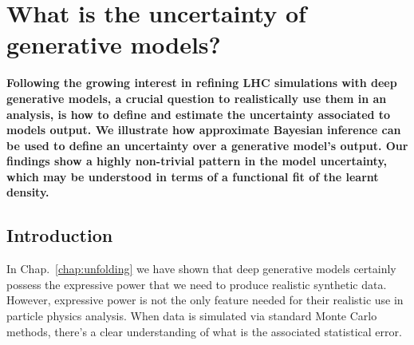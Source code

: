 %
%
%

\chapter[What is the uncertainty of generative models?]{What is the uncertainty of\\ generative models?}\label{chap:bnn}

\enlargethispage{2ex}
\vspace*{-2pt}

\enlargethispage{2ex}

{\bf Following the growing interest in refining LHC simulations with deep generative models, a crucial question to realistically use them in an analysis, is how to define and estimate the uncertainty associated to models output. 
We illustrate how approximate Bayesian inference can be used to define an uncertainty over a generative model's output.
Our findings show a highly non-trivial pattern in the model uncertainty, which may be understood in terms of a functional fit of the learnt density.}

\section{Introduction}
\label{sec:binnintro}

In Chap.~\ref{chap:unfolding} we have shown that deep generative models certainly
possess the expressive power that we need to produce realistic synthetic data.
However, expressive power is not the only feature needed for their realistic use
in particle physics analysis. When data is simulated via standard Monte Carlo methods,
there's a clear understanding of what is the associated statistical error. 

